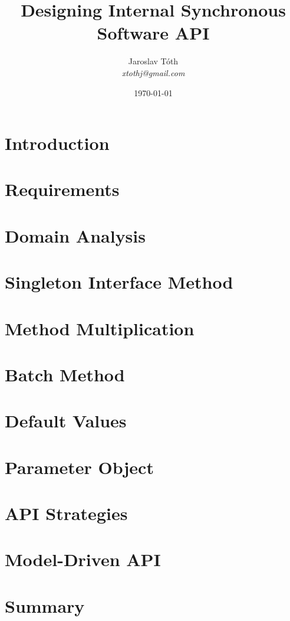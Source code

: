 \documentclass[11pt]{article}
\title{Designing Internal Synchronous Software API}
\author{Jaroslav Tóth \\\textit{xtothj@gmail.com}}
\date{\today}
\begin{document}
\maketitle

\section{Introduction}
\label{sec:introduction}


\section{Requirements}
\label{sec:requirements}


\section{Domain Analysis}
\label{sec:domain}


\section{Singleton Interface Method}
\label{sec:singleton_interface_method}


\section{Method Multiplication}
\label{sec:method_multiplication}


\section{Batch Method}
\label{sec:batch_method}


\section{Default Values}
\label{sec:default_values}


\section{Parameter Object}
\label{sec:parameter_object}


\section{API Strategies}
\label{sec:api_strategies}


\section{Model-Driven API}
\label{sec:model_driven_api}


\section{Summary}
\label{sec:summary}


\newpage


\end{document}
